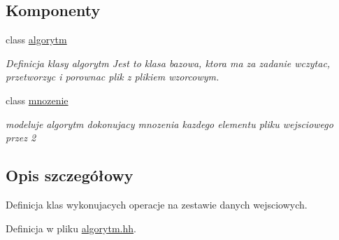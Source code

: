\subsection*{\-Komponenty}
\begin{DoxyCompactItemize}
\item 
class \hyperlink{classalgorytm}{algorytm}
\begin{DoxyCompactList}\small\item\em \-Definicja klasy algorytm \-Jest to klasa bazowa, ktora ma za zadanie wczytac, przetworzyc i porownac plik z plikiem wzorcowym. \end{DoxyCompactList}\item 
class \hyperlink{classmnozenie}{mnozenie}
\begin{DoxyCompactList}\small\item\em modeluje algorytm dokonujacy mnozenia kazdego elementu pliku wejsciowego przez 2 \end{DoxyCompactList}\end{DoxyCompactItemize}


\subsection{\-Opis szczegółowy}
\-Definicja klas wykonujacych operacje na zestawie danych wejsciowych. 

\-Definicja w pliku \hyperlink{algorytm_8hh_source}{algorytm.\-hh}.


